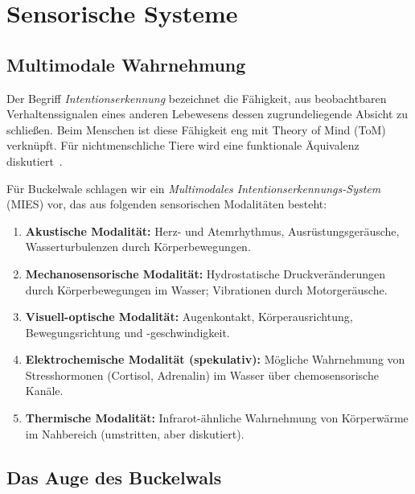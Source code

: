 ﻿\documentclass[12pt,a4paper]{article}
\theoremstyle{definition}
\theoremstyle{remark}
\begin{document}
\section{Sensorische Systeme}
\label{sec:wahrnehmung}

\subsection{Multimodale Wahrnehmung}

Der Begriff \emph{Intentionserkennung} bezeichnet die Fähigkeit, aus
beobachtbaren Verhaltenssignalen eines anderen Lebewesens dessen zugrundeliegende
Absicht zu schließen. Beim Menschen ist diese Fähigkeit eng mit Theory of Mind
(ToM) verknüpft. Für nichtmenschliche Tiere wird eine funktionale Äquivalenz
diskutiert~\cite{premack1978chimpanzee}.

Für Buckelwale schlagen wir ein \emph{Multimodales Intentionserkennungs-System}
(MIES) vor, das aus folgenden sensorischen Modalitäten besteht:

\begin{enumerate}[leftmargin=*, label=\textbf{M\arabic*.}]
  \item \textbf{Akustische Modalität:} Herz- und Atemrhythmus, Ausrüstungsgeräusche,
        Wasserturbulenzen durch Körperbewegungen.
  \item \textbf{Mechanosensorische Modalität:} Hydrostatische Druckveränderungen
        durch Körperbewegungen im Wasser; Vibrationen durch Motorgeräusche.
  \item \textbf{Visuell-optische Modalität:} Augenkontakt, Körperausrichtung,
        Bewegungsrichtung und -geschwindigkeit.
  \item \textbf{Elektrochemische Modalität (spekulativ):} Mögliche Wahrnehmung
        von Stresshormonen (Cortisol, Adrenalin) im Wasser über chemosensorische
        Kanäle.
  \item \textbf{Thermische Modalität:} Infrarot-ähnliche Wahrnehmung von
        Körperwärme im Nahbereich (umstritten, aber diskutiert).
\end{enumerate}

\subsection{Das Auge des Buckelwals}
\end{document}
